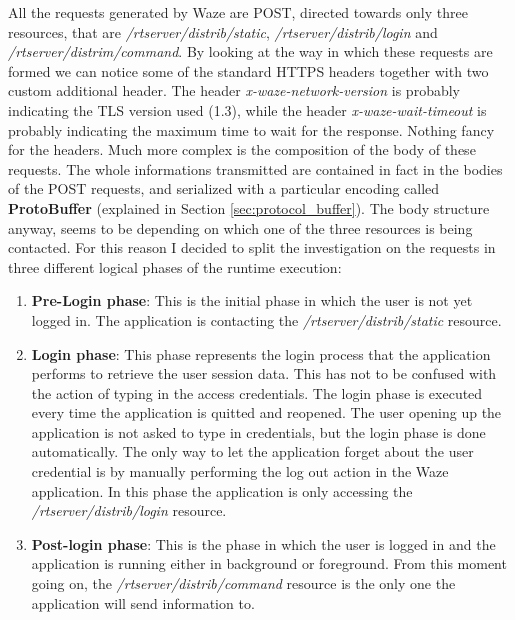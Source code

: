 		All the requests generated by Waze are POST, directed towards only three resources, that are \textit{/rtserver/distrib/static}, \textit{/rtserver/distrib/login} and \textit{/rtserver/distrim/command}. By looking at the way in which these requests are formed we can notice some of the standard HTTPS headers together with two custom additional header. The header \textit{x-waze-network-version} is probably indicating the TLS version used (1.3), while the header \textit{x-waze-wait-timeout} is probably indicating the maximum time to wait for the response. Nothing fancy for the headers.\newline
		Much more complex is the composition of the body of these requests. The whole informations transmitted are contained in fact in the bodies of the POST requests, and serialized with a particular encoding called \textbf{ProtoBuffer} (explained in Section \ref{sec:protocol_buffer}). The body structure anyway, seems to be depending on which one of the three resources is being contacted. For this reason I decided to split the investigation on the requests in three different logical phases of the runtime execution:
		\begin{enumerate}
			\item \textbf{Pre-Login phase}: This is the initial phase in which the user is not yet logged in. The application is contacting the \textit{/rtserver/distrib/static} resource.\newline
			\item \textbf{Login phase}: This phase represents the login process that the application performs to retrieve the user session data. This has not to be confused with the action of typing in the access credentials. The login phase is executed every time the application is quitted and reopened. The user opening up the application is not asked to type in credentials, but the login phase is done automatically. The only way to let the application forget about the user credential is by manually performing the log out action in the Waze application. \newline
			In this phase the application is only accessing the \textit{/rtserver/distrib/login} resource.\newline
			\item \textbf{Post-login phase}: This is the phase in which the user is logged in and the application is running either in background or foreground. From this moment going on, the \textit{/rtserver/distrib/command} resource is the only one the application will send information to.
		\end{enumerate}
